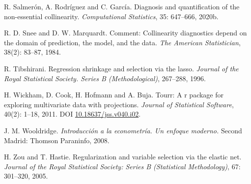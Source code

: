 \begin{CSLReferences}{1}{0}
\leavevmode{}%
R. Salmerón, A. Rodríguez and C. García. Diagnosis and quantification of the non-essential collinearity. \emph{Computational Statistics}, 35: 647--666, 2020b.

\leavevmode{}%
R. D. Snee and D. W. Marquardt. {Comment: Collinearity diagnostics depend on the domain of prediction, the model, and the data}. \emph{The American Statistician}, 38(2): 83--87, 1984.

\leavevmode{}%
R. Tibshirani. Regression shrinkage and selection via the lasso. \emph{Journal of the Royal Statistical Society. Series B (Methodological)}, 267--288, 1996.

\leavevmode{}%
H. Wickham, D. Cook, H. Hofmann and A. Buja. Tourr: A r package for exploring multivariate data with projections. \emph{Journal of Statistical Software}, 40(2): 1--18, 2011. DOI \href{https://doi.org/10.18637/jss.v040.i02}{10.18637/jss.v040.i02}.

\leavevmode{}%
J. M. Wooldridge. \emph{{Introducción a la econometría. Un enfoque moderno}.} Second Madrid: Thomson Paraninfo, 2008.

\leavevmode{}%
H. Zou and T. Hastie. Regularization and variable selection via the elastic net. \emph{Journal of the Royal Statistical Society: Series B (Statistical Methodology)}, 67: 301--320, 2005.

\end{CSLReferences}



\address{%
Roman Salmeron Gomez\\
University of Granada\\%
Department of Quantitative Methods for Economics and Busines\\ Poligono La Cartuja sn, 18071, Granada, Spain.\\
%
\url{http://metodoscuantitativos.ugr.es/pages/web/romansg}\\%
\textit{ORCiD: \href{https://orcid.org/0000-0003-2589-4058}{0000-0003-2589-4058}}\\%
\href{mailto:romansg@ugr.es}{\nolinkurl{romansg@ugr.es}}%
}

\address{%
Catalina B. Garcia Garcia\\
University of Granada\\%
Department of Quantitative Methods for Economics and Busines\\ Poligono La Cartuja sn, 18071, Granada, Spain.\\
%
\url{http://metodoscuantitativos.ugr.es/pages/web/cbgarcia}\\%
\textit{ORCiD: \href{https://orcid.org/0000-0003-1622-3877}{0000-0003-1622-3877}}\\%
\href{mailto:cbgarcia@ugr.es}{\nolinkurl{cbgarcia@ugr.es}}%
}


